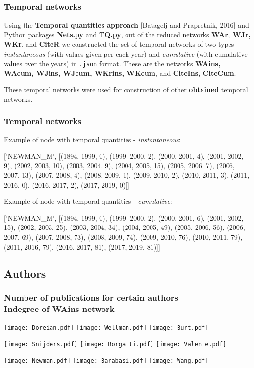 \documentclass[hyperref={pdfstartview={FitBH -32768},
                         pdfpagemode=FullScreen,
                         plainpages=false,
                         colorlinks=true}
              ]{beamer}
\begin{document}
\begin{frame}[fragile]
\frametitle{Temporal networks\\ \normalsize }
\small
Using the \textbf{Temporal quantities approach} [Batagelj and Praprotnik, 2016] and Python packages \textbf{Nets.py} and \textbf{TQ.py}, out of the reduced networks \textbf{WAr, WJr, WKr}, and \textbf{CiteR} we constructed the set of temporal networks of two types -- \textit{instantaneous} (with values given per each year) and \textit{cumulative} (with cumulative values over the years) in \texttt{.json} format. These are the networks \textbf{WAins, WAcum, WJins, WJcum, WKrins, WKcum}, and \textbf{CiteIns, CiteCum}. \medskip 

These temporal networks were used for construction of other \textbf{obtained} temporal networks.

\end{frame} 

\begin{frame}[fragile]
\frametitle{Temporal networks\\ \normalsize }
\small
Example of node with temporal quantities -  \textit{instantaneous}: \medskip

['NEWMAN\_M', [(1894, 1999, 0), (1999, 2000, 2), (2000, 2001, 4), (2001, 2002, 9), (2002, 2003, 10), (2003, 2004, 9), (2004, 2005, 15), (2005, 2006, 7), (2006, 2007, 13), (2007, 2008, 4), (2008, 2009, 1), (2009, 2010, 2), (2010, 2011, 3), (2011, 2016, 0), (2016, 2017, 2), (2017, 2019, 0)]] \medskip

Example of node with temporal quantities -  \textit{cumulative}: \medskip

['NEWMAN\_M', [(1894, 1999, 0), (1999, 2000, 2), (2000, 2001, 6), (2001, 2002, 15), (2002, 2003, 25), (2003, 2004, 34), (2004, 2005, 49), (2005, 2006, 56), (2006, 2007, 69), (2007, 2008, 73), (2008, 2009, 74), (2009, 2010, 76), (2010, 2011, 79), (2011, 2016, 79), (2016, 2017, 81), (2017, 2019, 81)]]


\end{frame} 

\subsection{Authors}

\begin{frame}[fragile]
\frametitle{Number of publications for certain authors \\ \normalsize Indegree of WAins network }
\begin{center}
\centerline{
\texttt{[image: Doreian.pdf]} 
\texttt{[image: Wellman.pdf]} 
\texttt{[image: Burt.pdf]}} 
\centerline{
\texttt{[image: Snijders.pdf]} 
\texttt{[image: Borgatti.pdf]} 
\texttt{[image: Valente.pdf]}}
\centerline{
\texttt{[image: Newman.pdf]} 
\texttt{[image: Barabasi.pdf]}
\texttt{[image: Wang.pdf]}} 
\end{center}
\end{frame} 
\end{document}
